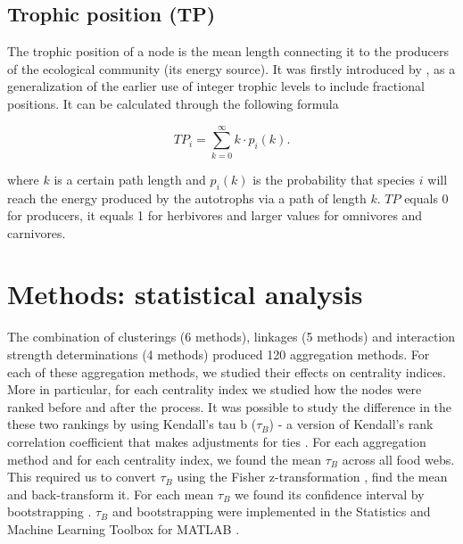	\subsection*{Trophic position (TP)}

		The trophic position of a node is the mean length connecting it to the producers of the ecological community (its energy source). It was firstly introduced by \citet{Levine1980}, as a generalization of the earlier use of integer trophic levels to include fractional positions. It can be calculated through the following formula

						\begin{equation}
							TP_i=\sum\limits_{k=0}^\infty k \cdot p_i(k).
						\end{equation}

		\noindent where $k$ is a certain path length and $p_i(k)$ is the probability that species $i$ will reach the energy produced by the autotrophs via a path of length $k$. $TP$ equals 0 for producers, it equals 1 for herbivores and larger values for omnivores and carnivores.

\section*{Methods: statistical analysis}

	The combination of clusterings (6 methods), linkages (5 methods) and interaction strength determinations (4 methods) produced 120 aggregation methods. For each of these aggregation methods, we studied their effects on centrality indices. More in particular, for each centrality index we studied how the nodes were ranked before and after the process. It was possible to study the difference in the these two rankings by using Kendall's tau b ($\tau_B$) - a version of Kendall's rank correlation coefficient that makes adjustments for ties \citep{Agresti2012}. For each aggregation method and for each centrality index, we found the mean $\tau_B$ across all food webs. This required us to convert $\tau_B$ using the Fisher z-transformation \citep{Fisher1915}, find the mean and back-transform it. For each mean $\tau_B$ we found its confidence interval by bootstrapping \citep{DiCiccio1996}. $\tau_B$ and bootstrapping were implemented in the Statistics and Machine Learning Toolbox for MATLAB \citep{MathworksInc.2019}.
